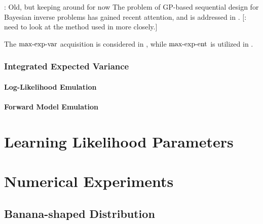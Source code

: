 \documentclass[12pt]{article}
\begin{document}
\todo: Old, but keeping around for now 
The problem of GP-based sequential design for Bayesian inverse problems  
has gained recent attention, and is addressed in 
\cite{SinsbeckNowak, Surer2023sequential, VehtariParallelGP, briol2017sampling, ranjan2016inverse, 
	landslideCalibration, KandasamyActiveLearning2015, Kandasamy_2017, wang2018adaptive,   
	weightedIVAR, quantileApprox, hydrologicalModel}. 
[\todo: need to look at the method used in \cite{quantileApprox, hydrologicalModel} more closely.]

The $\textrm{max-exp-var}$ acquisition is considered in 
\cite{KandasamyActiveLearning2015, Kandasamy_2017}, 
while $\textrm{max-exp-ent}$ is utilized in \cite{wang2018adaptive, landslideCalibration}. 

\subsubsection{Integrated Expected Variance}

\paragraph{Log-Likelihood Emulation}

\paragraph{Forward Model Emulation}

\section{Learning Likelihood Parameters} \label{section_lik_par}

\section{Numerical Experiments}

\subsection{Banana-shaped Distribution} \label{banana_example}

\end{document}
